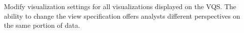  Modify visualization settings for all visualizations displayed on the VQS. The ability to change the view specification offers analysts different perspectives on the same portion of data.
